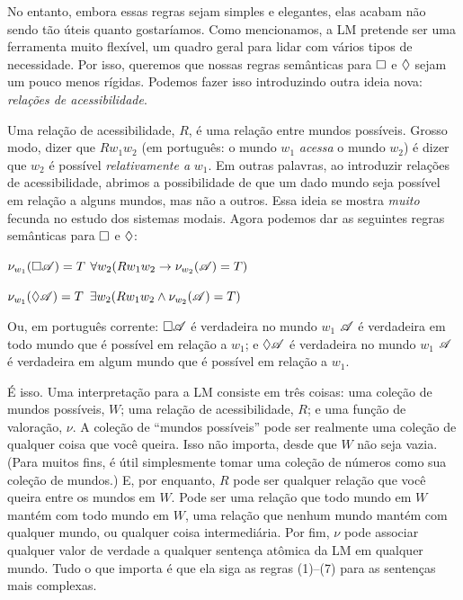 No entanto, embora essas regras sejam simples e elegantes, elas acabam não sendo tão úteis quanto gostaríamos. Como mencionamos, a LM pretende ser uma ferramenta muito flexível, um quadro geral para lidar com vários tipos de necessidade. Por isso, queremos que nossas regras semânticas para $\Box$ e $\Diamond$ sejam um pouco menos rígidas. Podemos fazer isso introduzindo outra ideia nova: \emph{relações de acessibilidade}.

Uma relação de acessibilidade, $R$, é uma relação entre mundos possíveis. Grosso modo, dizer que $Rw_1w_2$ (em português: o mundo $w_1$ \emph{acessa} o mundo $w_2$) é dizer que $w_2$ é possível \emph{relativamente a} $w_1$. Em outras palavras, ao introduzir relações de acessibilidade, abrimos a possibilidade de que um dado mundo seja possível em relação a alguns mundos, mas não a outros. Essa ideia se mostra \emph{muito} fecunda no estudo dos sistemas modais. Agora podemos dar as seguintes regras semânticas para $\Box$ e $\Diamond$:
\begin{compactlist}[resume]
	\item $\nu_{w_1}(\Box \mathscr{A})=T$ \ifeff{} $\forall w_2 (Rw_1w_2\rightarrow \nu_{w_2}(\mathscr{A})=T)$
	\item $\nu_{w_1}(\Diamond \mathscr{A})=T$ \ifeff{} $\exists w_2 (Rw_1w_2\wedge \nu_{w_2}(\mathscr{A})=T)$
\end{compactlist}
Ou, em português corrente: $\Box\mathscr{A}$ é verdadeira no mundo $w_1$ \ifeff{} $\mathscr{A}$ é verdadeira em todo mundo que é possível em relação a $w_1$; e $\Diamond\mathscr{A}$ é verdadeira no mundo $w_1$ \ifeff{} $\mathscr{A}$ é verdadeira em algum mundo que é possível em relação a $w_1$.

É isso. Uma interpretação para a LM consiste em três coisas: uma coleção de mundos possíveis, $W$; uma relação de acessibilidade, $R$; e uma função de valoração, $\nu$. A coleção de \textquotedblleft mundos possíveis\textquotedblright{} pode ser realmente uma coleção de qualquer coisa que você queira. Isso não importa, desde que $W$ não seja vazia. (Para muitos fins, é útil simplesmente tomar uma coleção de números como sua coleção de mundos.) E, por enquanto, $R$ pode ser qualquer relação que você queira entre os mundos em $W$. Pode ser uma relação que todo mundo em $W$ mantém com todo mundo em $W$, uma relação que nenhum mundo mantém com qualquer mundo, ou qualquer coisa intermediária. Por fim, $\nu$ pode associar qualquer valor de verdade a qualquer sentença atômica da LM em qualquer mundo. Tudo o que importa é que ela siga as regras (1)--(7) para as sentenças mais complexas.

